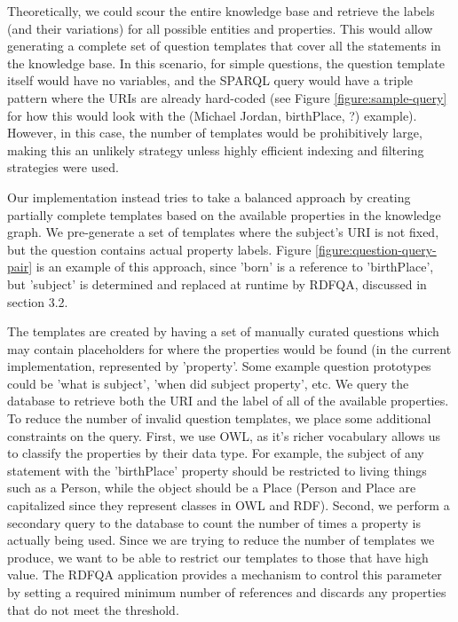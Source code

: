 \documentclass[sigplan,screen]{acmart}
\begin{document}
Theoretically, we could scour the entire knowledge base and retrieve the labels (and their variations) for all possible entities and properties. This would allow generating a complete set of question templates that cover all the statements in the knowledge base. In this scenario, for simple questions, the question template itself would have no variables, and the SPARQL query would have a triple pattern where the URIs are already hard-coded (see Figure \ref{figure:sample-query} for how this would look with the (Michael Jordan, birthPlace, ?) example). However, in this case, the number of templates would be prohibitively large, making this an unlikely strategy unless highly efficient indexing and filtering strategies were used.

Our implementation instead tries to take a balanced approach by creating partially complete templates based on the available properties in the knowledge graph. We pre-generate a set of templates where the subject's URI is not fixed, but the question contains actual property labels. Figure \ref{figure:question-query-pair} is an example of this approach, since 'born' is a reference to 'birthPlace', but '{subject}' is determined and replaced at runtime by RDFQA, discussed in section 3.2.

The templates are created by having a set of manually curated questions which may contain placeholders for where the properties would be found (in the current implementation, represented by '{property}'. Some example question prototypes could be 'what is {subject}', 'when did {subject} {property}', etc. We query the database to retrieve both the URI and the label of all of the available properties. To reduce the number of invalid question templates, we place some additional constraints on the query. First, we use OWL, as it's richer vocabulary allows us to classify the properties by their data type. For example, the subject of any statement with the 'birthPlace' property should be restricted to living things such as a Person, while the object should be a Place (Person and Place are capitalized since they represent classes in OWL and RDF). Second, we perform a secondary query to the database to count the number of times a property is actually being used. Since we are trying to reduce the number of templates we produce, we want to be able to restrict our templates to those that have high value. The RDFQA application provides a mechanism to control this parameter by setting a required minimum number of references and discards any properties that do not meet the threshold.
\end{document}
